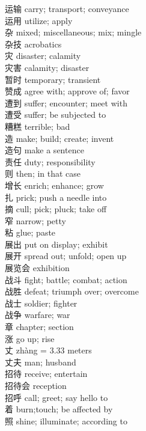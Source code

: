 运输 \quad carry; transport; conveyance\\
运用 \quad utilize; apply\\
杂 \quad mixed; miscellaneous; mix; mingle\\
杂技 \quad acrobatics\\
灾 \quad disaster; calamity\\
灾害 \quad calamity; disaster\\
暂时 \quad temporary; transient\\
赞成 \quad agree with; approve of; favor\\
遭到 \quad suffer; encounter; meet with\\
遭受 \quad suffer; be subjected to\\
糟糕 \quad terrible; bad\\
造 \quad make; build; create; invent\\
造句 \quad make a sentence\\
责任 \quad duty; responsibility\\
则 \quad then; in that case\\
增长 \quad enrich; enhance; grow\\
扎 \quad prick; push a needle into\\
摘 \quad cull; pick; pluck; take off\\
窄 \quad narrow; petty\\
粘 \quad glue; paste\\
展出 \quad put on display; exhibit\\
展开 \quad spread out; unfold; open up\\
展览会 \quad exhibition\\
战斗 \quad fight; battle; combat; action\\
战胜 \quad defeat; triumph over; overcome\\
战士 \quad soldier; fighter\\
战争 \quad warfare; war\\
章 \quad chapter; section\\
涨 \quad go up; rise\\
丈  zhàng = 3.33 meters\\
丈夫 \quad man; husband\\
招待 \quad receive; entertain\\
招待会 \quad reception\\
招呼 \quad call; greet; say hello to\\
着 \quad burn;touch; be affected by\\
照 \quad shine; illuminate; according to\\
